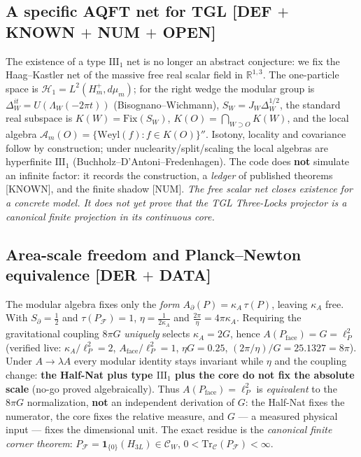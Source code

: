 \documentclass[11pt]{article}
\theoremstyle{definition}\newtheorem{deriv}{Derivation}
\begin{document}
\subsection*{A specific AQFT net for TGL \textsf{[DEF $+$ KNOWN $+$ NUM $+$ OPEN]}}

The existence of a type $\mathrm{III}_1$ net is no longer an abstract conjecture: we fix the Haag--Kastler net of the massive free real scalar field in $\mathbb R^{1,3}$. The one-particle space is $\mathcal H_1=L^2(H_m^+,d\mu_m)$; for the right wedge the modular group is $\Delta_W^{it}=U(\Lambda_W(-2\pi t))$ (Bisognano--Wichmann), $S_W=J_W\Delta_W^{1/2}$, the standard real subspace is $K(W)=\mathrm{Fix}(S_W)$, $K(O)=\bigcap_{W\supset O}K(W)$, and the local algebra $\mathcal A_m(O)=\{\mathrm{Weyl}(f):f\in K(O)\}''$. Isotony, locality and covariance follow by construction; under nuclearity/split/scaling the local algebras are hyperfinite $\mathrm{III}_1$ (Buchholz--D'Antoni--Fredenhagen). The code does \textbf{not} simulate an infinite factor: it records the construction, a \emph{ledger} of published theorems \textsf{[KNOWN]}, and the finite shadow \textsf{[NUM]}. \emph{The free scalar net closes existence for a concrete model. It does not yet prove that the TGL Three-Locks projector is a canonical finite projection in its continuous core.}

\subsection*{Area-scale freedom and Planck--Newton equivalence \textsf{[DER $+$ DATA]}}

The modular algebra fixes only the \emph{form} $A_\partial(P)=\kappa_A\,\tau(P)$, leaving $\kappa_A$ free. With $S_\partial=\tfrac12$ and $\tau(P_{\mathcal F})=1$, $\eta=\tfrac{1}{2\kappa_A}$ and $\tfrac{2\pi}{\eta}=4\pi\kappa_A$. Requiring the gravitational coupling $8\pi G$ \emph{uniquely} selects $\kappa_A=2G$, hence $A(P_{\mathrm{face}})=G=\ell_P^2$ (verified live: $\kappa_A/\ell_P^2=2$, $A_{\mathrm{face}}/\ell_P^2=1$, $\eta G=0.25$, $(2\pi/\eta)/G=25.1327=8\pi$). Under $A\to\lambda A$ every modular identity stays invariant while $\eta$ and the coupling change: \textbf{the Half-Nat plus type $\mathrm{III}_1$ plus the core do not fix the absolute scale} (no-go proved algebraically). Thus $A(P_{\mathrm{face}})=\ell_P^2$ is \emph{equivalent} to the $8\pi G$ normalization, \textbf{not} an independent derivation of $G$: the Half-Nat fixes the numerator, the core fixes the relative measure, and $G$ --- a measured physical input --- fixes the dimensional unit. The exact residue is the \emph{canonical finite corner theorem}: $P_{\mathcal F}=\mathbf 1_{\{0\}}(H_{3L})\in\mathcal C_W$, $0<\mathrm{Tr}_{\mathcal C}(P_{\mathcal F})<\infty$.
\end{document}
